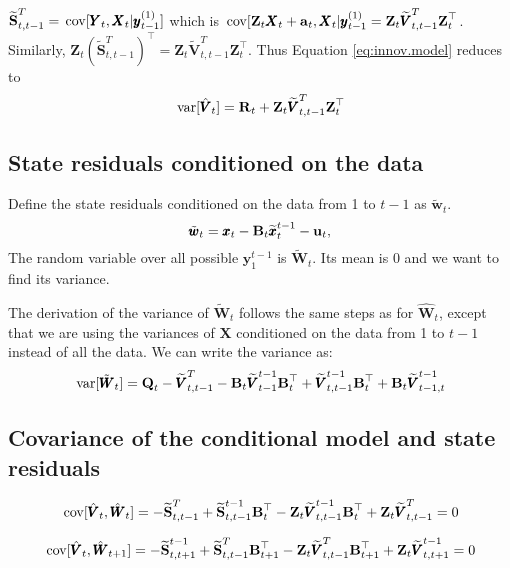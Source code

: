 \documentclass[]{article}
\def\UPS{\mbox{\boldmath $\Upsilon$}}
\def\XI{\mbox{\boldmath $\Xi$}}
\def\BB{\mbox{$\mathbf B$}}	\def\bb{\mbox{$\mathbf b$}} \def\Bb{\mbox{$\mathbf J$}} \def\Ba{\mbox{$\mathbf L$}} \def\Bm{\UPS}
\def\QQ{\mbox{$\mathbf Q$}}	 \def\qq{\mbox{$\mathbf q$}} \def\Qb{\mbox{$\mathbf G$}}  \def\Qm{\mathbb{Q}}
\def\RR{\mbox{$\mathbf R$}}	 \def\rr{\mbox{$\mathbf r$}} \def\Rb{\mbox{$\mathbf H$}}	\def\Rm{\mathbb{R}}
\def\Ss{\mbox{$\mathbf S$}}
\def\VV{\mbox{$\pmb{V}$}}	\def\vv{\mbox{$\pmb{v}$}}
\def\WW{\mbox{$\pmb{W}$}}	\def\ww{\mbox{$\pmb{w}$}}
\def\XX{\mbox{$\pmb{X}$}}	\def\xx{\mbox{$\pmb{x}$}}
\def\YY{\mbox{$\pmb{Y}$}}	\def\yy{\mbox{$\pmb{y}$}}
\def\ZZ{\mbox{$\mathbf Z$}}	\def\zz{\mbox{$\mathbf z$}}	\def\Zb{\mbox{$\mathbf M$}} \def\Za{\mbox{$\mathbf N$}} \def\Zm{\XI}
\def\var{\,\textup{\textrm{var}}}
\def\cov{\,\textup{\textrm{cov}}}
\def\hatxttm{\widetilde{\xx}_t^{t-1}}
\def\hatVtmtm{\widetilde{\VV}_{t-1}^{t-1}}
\def\hatVttm{\widetilde{\VV}_{t,t-1}^T}
\def\hatVttmtm{\widetilde{\VV}_{t,t-1}^{t-1}}
\def\hatSttm{\widetilde{\Ss}_t^{t-1}}
\def\hatSttm{\widetilde{\Ss}_{t,t-1}^T}
\def\hatSttmtm{\widetilde{\Ss}_{t,t-1}^{t-1}}
\def\hatSttptm{\widetilde{\Ss}_{t,t+1}^{t-1}}
\begin{document}
$\hatSttm=\cov[\YY_t,\XX_t|\yy^{(1)}_{t-1}]$ which is $\cov[\ZZ_t \XX_t + \aa_t,\XX_t|\yy^{(1)}_{t-1} = \ZZ_t \hatVttm \ZZ_t^\top$. Similarly, $\ZZ_t(\hatSttm)^\top=\ZZ_t \hatVttm \ZZ_t^\top$. Thus Equation \ref{eq:innov.model} reduces to
\begin{equation}\label{eq:innov.model2}
\var[\hat{\VV}_t] = \RR_t + \ZZ_t \hatVttm \ZZ_t^\top
\end{equation}

\subsection{State residuals conditioned on the data}

Define the state residuals conditioned on the data from 1 to $t-1$ as $\tilde{\ww}_t$.
\begin{equation}\label{eq:vtT}
\tilde{\ww}_t = \xx_t - \BB_t\hatxttm - \uu_t,
\end{equation}
The random variable over all possible $\yy_1^{t-1}$ is $\tilde{\WW}_t$. Its mean is 0 and we want to find its variance.

The derivation of the variance of $\tilde{\WW}_t$ follows the same steps as for $\hat{\WW}_t$, except that we are using the variances of $\XX$ conditioned on the data from 1 to $t-1$ instead of all the data.  We can write the variance as:
\begin{equation}
\var[\tilde{\WW}_t]  =  \QQ_t - \hatVttm - \BB_t \hatVtmtm \BB_t^\top + \hatVttmtm \BB_t^\top + \BB_t\widetilde{\VV}_{t-1,t}^{t-1}
\end{equation}

\subsection{Covariance of the conditional model and state residuals}

\begin{equation}
\cov[\hat{\VV}_t,\hat{\WW}_t] = - \hatSttm + \hatSttmtm\BB_t^\top - \ZZ_t\hatVttmtm\BB_t^\top + \ZZ_t\hatVttm = 0
\end{equation}


\begin{equation}
\cov[\hat{\VV}_t,\hat{\WW}_{t+1}] = - \hatSttptm + \hatSttm\BB_{t+1}^\top  - \ZZ_t\hatVttm\BB_{t+1}^\top + \ZZ_t\widetilde{\VV}_{t,t+1}^{t-1} = 0
\end{equation}
\end{document}
